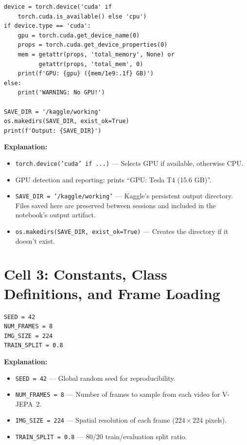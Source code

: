 \documentclass[a4paper, 12pt]{article}
\newenvironment{explanation}{%
  \par\smallskip
  \noindent\textcolor{blue!70!black}{\textbf{Explanation:}}\\
  \noindent
}{\par\medskip}
\begin{document}
\begin{lstlisting}
device = torch.device('cuda' if
    torch.cuda.is_available() else 'cpu')
if device.type == 'cuda':
    gpu = torch.cuda.get_device_name(0)
    props = torch.cuda.get_device_properties(0)
    mem = getattr(props, 'total_memory', None) or
          getattr(props, 'total_mem', 0)
    print(f'GPU: {gpu} ({mem/1e9:.1f} GB)')
else:
    print('WARNING: No GPU!')

SAVE_DIR = '/kaggle/working'
os.makedirs(SAVE_DIR, exist_ok=True)
print(f'Output: {SAVE_DIR}')
\end{lstlisting}

\begin{explanation}
\begin{itemize}[nosep]
  \item \texttt{torch.device('cuda' if ...)} --- Selects GPU if available, otherwise CPU.
  \item GPU detection and reporting: prints ``GPU: Tesla T4 (15.6 GB)''.
  \item \texttt{SAVE\_DIR = '/kaggle/working'} --- Kaggle's persistent output directory. Files saved here are preserved between sessions and included in the notebook's output artifact.
  \item \texttt{os.makedirs(SAVE\_DIR, exist\_ok=True)} --- Creates the directory if it doesn't exist.
\end{itemize}
\end{explanation}

\newpage
\section{Cell 3: Constants, Class Definitions, and Frame Loading}

\begin{lstlisting}
SEED = 42
NUM_FRAMES = 8
IMG_SIZE = 224
TRAIN_SPLIT = 0.8
\end{lstlisting}

\begin{explanation}
\begin{itemize}[nosep]
  \item \texttt{SEED = 42} --- Global random seed for reproducibility.
  \item \texttt{NUM\_FRAMES = 8} --- Number of frames to sample from each video for V-JEPA~2.
  \item \texttt{IMG\_SIZE = 224} --- Spatial resolution of each frame ($224 \times 224$ pixels).
  \item \texttt{TRAIN\_SPLIT = 0.8} --- 80/20 train/evaluation split ratio.
\end{itemize}
\end{explanation}
\end{document}
